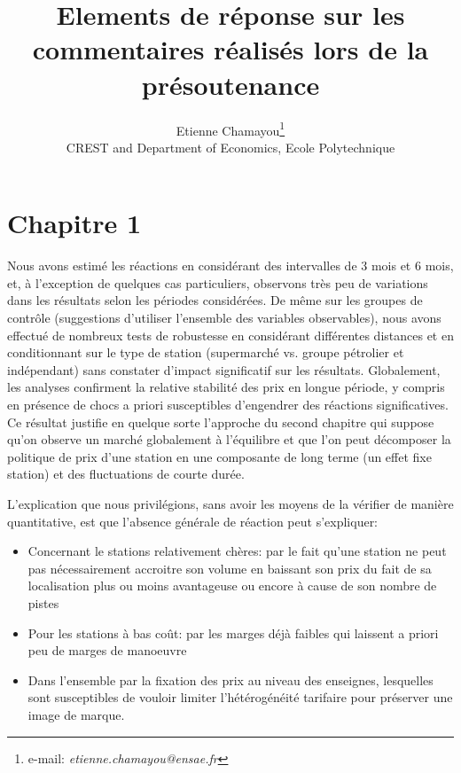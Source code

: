 \documentclass[11pt]{article}
\begin{document}
\title{Elements de réponse sur les commentaires réalisés lors de la présoutenance}

\author{Etienne Chamayou\thanks{e-mail:
\textit{etienne.chamayou@ensae.fr}}\medskip\\{\normalsize CREST and Department of Economics, Ecole Polytechnique }}
\maketitle

\pagebreak%
\doublespacing

\section{Chapitre 1}

Nous avons estimé les réactions en considérant des intervalles de 3 mois et 6 mois, et, à l'exception de quelques cas particuliers, observons très peu de variations dans les résultats selon les périodes considérées.
De même sur les groupes de contrôle (suggestions d'utiliser l'ensemble des variables observables), nous avons effectué de nombreux tests de robustesse en considérant différentes distances et en conditionnant sur le type de station (supermarché vs. groupe pétrolier et indépendant) sans constater d'impact significatif sur les résultats.
Globalement, les analyses confirment la relative stabilité des prix en longue période, y compris en présence de chocs a priori susceptibles d'engendrer des réactions significatives. Ce résultat justifie en quelque sorte l'approche du second chapitre qui suppose qu'on observe un marché globalement à l'équilibre et que l'on peut décomposer la politique de prix d'une station en une composante de long terme (un effet fixe station) et des fluctuations de courte durée.

L'explication que nous privilégions, sans avoir les moyens de la vérifier de manière quantitative, est que l'absence générale de réaction peut s'expliquer:
\begin{itemize}
\item Concernant le stations relativement chères: par le fait qu'une station ne peut pas nécessairement accroitre son volume en baissant son prix du fait de sa localisation plus ou moins avantageuse ou encore à cause de son nombre de pistes
\item Pour les stations à bas coût: par les marges déjà faibles qui laissent a priori peu de marges de manoeuvre
\item Dans l'ensemble par la fixation des prix au niveau des enseignes, lesquelles sont susceptibles de vouloir limiter l'hétérogénéité tarifaire pour préserver une image de marque.
\end{itemize}
\end{document}
